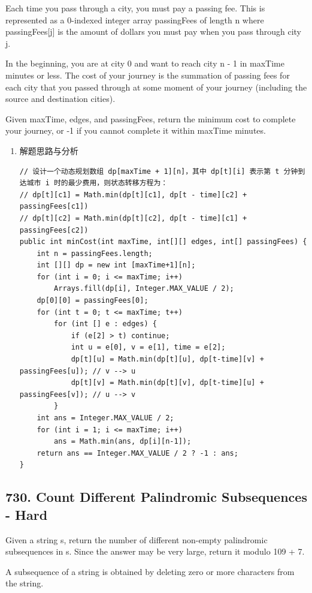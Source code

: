 \documentclass[9pt, b5paaper]{book}
\begin{document}
Each time you pass through a city, you must pay a passing fee. This is represented as a 0-indexed integer array passingFees of length n where passingFees[j] is the amount of dollars you must pay when you pass through city j.

In the beginning, you are at city 0 and want to reach city n - 1 in maxTime minutes or less. The cost of your journey is the summation of passing fees for each city that you passed through at some moment of your journey (including the source and destination cities).

Given maxTime, edges, and passingFees, return the minimum cost to complete your journey, or -1 if you cannot complete it within maxTime minutes.
\begin{enumerate}
\item 解题思路与分析
\label{sec-1-4-10-1}
\begin{verbatim}
// 设计一个动态规划数组 dp[maxTime + 1][n]，其中 dp[t][i] 表示第 t 分钟到达城市 i 时的最少费用，则状态转移方程为：
// dp[t][c1] = Math.min(dp[t][c1], dp[t - time][c2] + passingFees[c1])
// dp[t][c2] = Math.min(dp[t][c2], dp[t - time][c1] + passingFees[c2])
public int minCost(int maxTime, int[][] edges, int[] passingFees) {
    int n = passingFees.length;
    int [][] dp = new int [maxTime+1][n];
    for (int i = 0; i <= maxTime; i++) 
        Arrays.fill(dp[i], Integer.MAX_VALUE / 2);
    dp[0][0] = passingFees[0];
    for (int t = 0; t <= maxTime; t++) 
        for (int [] e : edges) {
            if (e[2] > t) continue;
            int u = e[0], v = e[1], time = e[2];
            dp[t][u] = Math.min(dp[t][u], dp[t-time][v] + passingFees[u]); // v --> u
            dp[t][v] = Math.min(dp[t][v], dp[t-time][u] + passingFees[v]); // u --> v
        }
    int ans = Integer.MAX_VALUE / 2;
    for (int i = 1; i <= maxTime; i++)
        ans = Math.min(ans, dp[i][n-1]);
    return ans == Integer.MAX_VALUE / 2 ? -1 : ans;
}
\end{verbatim}
\end{enumerate}

\subsection{730. Count Different Palindromic Subsequences - Hard}
\label{sec-1-4-11}
Given a string s, return the number of different non-empty palindromic subsequences in s. Since the answer may be very large, return it modulo 109 + 7.

A subsequence of a string is obtained by deleting zero or more characters from the string.
\end{document}
